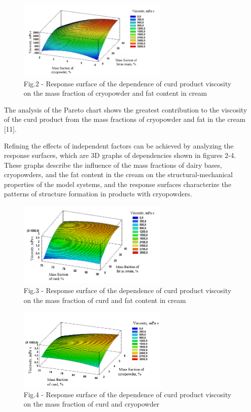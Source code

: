 \begin{figure}[H]
	\centering
	\includegraphics[width=0.65\textwidth]{media/pish2/image82}
	\caption*{Fig.2 - Response surface of the dependence of curd product viscosity on the mass fraction of cryopowder and fat content in cream}
\end{figure}

\begin{multicols}{2}
The analysis of the Pareto chart shows the greatest contribution to the
viscosity of the curd product from the mass fractions of cryopowder and
fat in the cream {[}11{]}.

Refining the effects of independent factors can be achieved by analyzing
the response surfaces, which are 3D graphs of dependencies shown in
figures 2-4. These graphs describe the influence of the mass fractions
of dairy bases, cryopowders, and the fat content in the cream on the
structural-mechanical properties of the model systems, and the response
surfaces characterize the patterns of structure formation in products
with cryopowders.
\end{multicols}

\begin{figure}[H]
	\centering
	\includegraphics[width=0.65\textwidth]{media/pish2/image83}
	\caption*{Fig.3 - Response surface of the dependence of curd product
viscosity on the mass fraction of curd and fat content in cream}
\end{figure}

\begin{figure}[H]
	\centering
	\includegraphics[width=0.65\textwidth]{media/pish2/image84}
	\caption*{Fig.4 - Response surface of the dependence of curd product viscosity on the mass fraction of curd and cryopowder}
\end{figure}

